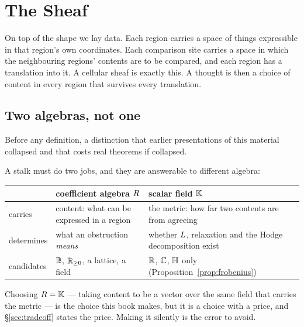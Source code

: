\chapter{The Sheaf}\label{ch:sheaf}

\begin{intu}\Intu
On top of the shape we lay data. Each region carries a space of things
expressible in that region's own coordinates. Each comparison site carries a
space in which the neighbouring regions' contents are to be compared, and each
region has a translation into it. A cellular sheaf is exactly this. A thought
is then a choice of content in every region that survives every translation.
\end{intu}

\section{Two algebras, not one}\label{sec:twoalgebras}

Before any definition, a distinction that earlier presentations of this
material collapsed and that costs real theorems if collapsed.

A stalk must do two jobs, and they are answerable to different algebra:

\begin{center}
\begin{tabular}{@{}>{\raggedright\arraybackslash}p{}%
                  >{\raggedright\arraybackslash}p{}%
                  >{\raggedright\arraybackslash}p{}@{}}
\toprule
 & \textbf{coefficient algebra $R$} & \textbf{scalar field $\mathbb{K}$}\\
\midrule
carries & content: what can be expressed in a region & the metric: how far two
  contents are from agreeing\\
\addlinespace[2pt]
determines & what an obstruction \emph{means} & whether $L$, relaxation and
  the Hodge decomposition exist\\
\addlinespace[2pt]
candidates & $\mathbb{B}$, $\mathbb{R}_{\ge 0}$, a lattice, a field & $\mathbb{R}$, $\mathbb{C}$, $\mathbb{H}$ only
  (Proposition~\ref{prop:frobenius})\\
\bottomrule
\end{tabular}
\end{center}

Choosing $R=\mathbb{K}$ --- taking content to be a vector over the same field
that carries the metric --- is the choice this book makes, but it is a choice
with a price, and \S\ref{sec:tradeoff} states the price. Making it silently is
the error to avoid.

